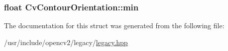 \hypertarget{structCvContourOrientation_ad8eae1d7da57b3a437d764d0f23c8439}{
\subsubsection[{min}]{\setlength{\rightskip}{0pt plus 5cm}float Cv\-Contour\-Orientation\-::min}}\label{structCvContourOrientation_ad8eae1d7da57b3a437d764d0f23c8439}


The documentation for this struct was generated from the following file\-:\begin{DoxyCompactItemize}
\item 
/usr/include/opencv2/legacy/\hyperlink{legacy_8hpp}{legacy.\-hpp}\end{DoxyCompactItemize}
